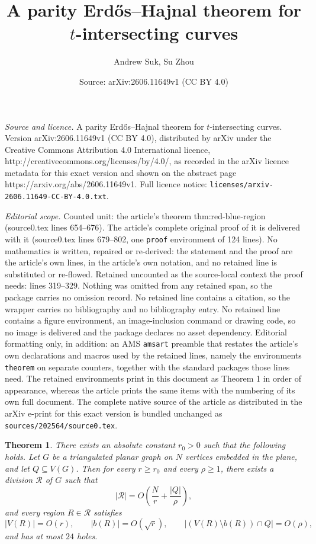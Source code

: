 \documentclass[10pt,a4paper]{amsart}
\title{A parity Erd\H{o}s--Hajnal theorem for \(t\)-intersecting curves}
\author{Andrew Suk, Su Zhou}
\date{Source: arXiv:2606.11649v1 (CC BY 4.0)}
\newtheorem{theorem}{Theorem}
\begin{document}
\maketitle

\noindent\emph{Source and licence.} A parity Erd\H{o}s--Hajnal theorem for \(t\)-intersecting curves. Version arXiv:2606.11649v1 (CC BY 4.0), distributed by arXiv under the Creative Commons Attribution 4.0 International licence, http://creativecommons.org/licenses/by/4.0/, as recorded in the arXiv licence metadata for this exact version and shown on the abstract page https://arxiv.org/abs/2606.11649v1. Full licence notice: \texttt{licenses/arxiv-2606.11649-CC-BY-4.0.txt}.\par\smallskip

\noindent\textit{Editorial scope.} Counted unit: the article's theorem thm:red-blue-region (source0.tex lines 654--676). The article's complete original proof of it is delivered with it (source0.tex lines 679--802, one \texttt{proof} environment of 124 lines). No mathematics is written, repaired or re-derived: the statement and the proof are the article's own lines, in the article's own notation, and no retained line is substituted or re-flowed.  Retained uncounted as the source-local context the proof needs: lines 319--329.  Nothing was omitted from any retained span, so the package carries no omission record.  No retained line contains a citation, so the wrapper carries no bibliography and no bibliography entry.  No retained line contains a figure environment, an image-inclusion command or drawing code, so no image is delivered and the package declares no asset dependency.  Editorial formatting only, in addition: an AMS \texttt{amsart} preamble that restates the article's own declarations and macros used by the retained lines, namely the environments \texttt{theorem} on separate counters, together with the standard packages those lines need.  The retained environments print in this document as Theorem 1 in order of appearance, whereas the article prints the same items with the numbering of its own full document.  The complete native source of the article as distributed in the arXiv e-print for this exact version is bundled unchanged as \texttt{sources/202564/source0.tex}.
\begin{theorem}\label{thm:mixed}
There exists an absolute constant \(r_0>0\) such that the following holds. Let \(G\) be a triangulated planar graph on \(N\) vertices embedded in the plane, and let \(Q\subseteq V(G)\). Then for every \(r\ge r_0\) and every \(\rho\ge 1\), there exists a division \(\mathcal R\) of \(G\) such that
\[
|\mathcal R|=O\!\left(\frac{N}{r}+\frac{|Q|}{\rho}\right),
\]
and every region \(R\in\mathcal R\) satisfies
\[
|V(R)|=O(r),\qquad |b(R)|=O(\sqrt r),\qquad |(V(R)\setminus b(R))\cap Q|=O(\rho),
\]
and has at most \(24\) holes.
\end{theorem}
\end{document}
